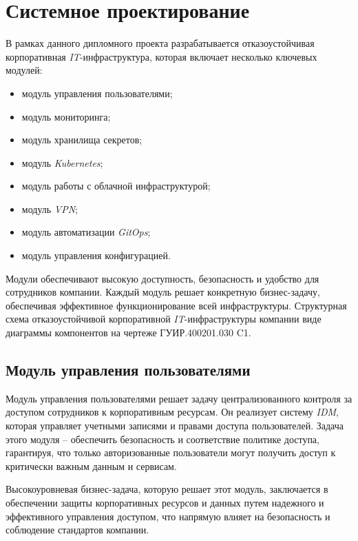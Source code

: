 \section{Системное проектирование}

В рамках данного дипломного проекта разрабатывается отказоустойчивая корпоративная \textit{IT}-инфраструктура, которая включает несколько ключевых модулей:
\begin{itemize}
    \item модуль управления пользователями;
    \item модуль мониторинга;
    \item модуль хранилища секретов;
    \item модуль \textit{Kubernetes};
    \item модуль работы с облачной инфраструктурой;
    \item модуль \textit{VPN};
    \item модуль автоматизации \textit{GitOps};
    \item модуль управления конфигурацией.
\end{itemize}

Модули обеспечивают высокую доступность, безопасность и удобство для сотрудников компании. Каждый модуль решает конкретную бизнес-задачу, обеспечивая эффективное функционирование всей инфраструктуры. Структурная схема  отказоустойчивой корпоративной \textit{IT}-инфраструктуры компании виде диаграммы компонентов на чертеже ГУИР.400201.030 C1. 

\subsection{Модуль управления пользователями} 
\label{sec:user_management_module}

Модуль управления пользователями решает задачу централизованного контроля за доступом сотрудников к корпоративным ресурсам. Он реализует систему \textit{IDM}, которая управляет учетными записями и правами доступа пользователей. Задача этого модуля -- обеспечить безопасность и соответствие политике доступа, гарантируя, что только авторизованные пользователи могут получить доступ к критически важным данным и сервисам.

Высокоуровневая бизнес-задача, которую решает этот модуль, заключается в обеспечении защиты корпоративных ресурсов и данных путем надежного и эффективного управления доступом, что напрямую влияет на безопасность и соблюдение стандартов компании.

